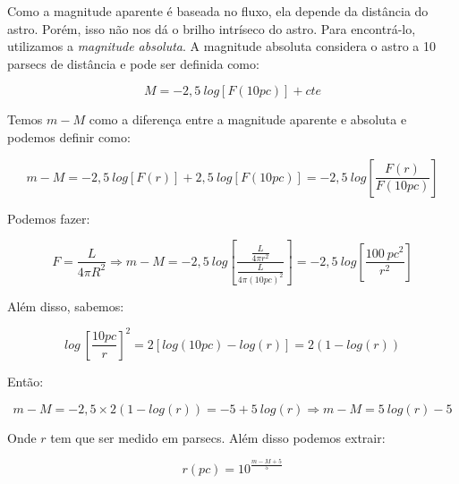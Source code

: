 Como a magnitude aparente é baseada no fluxo, ela depende da distância do astro. Porém, isso não nos dá o brilho intríseco do astro. Para encontrá-lo, utilizamos a \textit{magnitude absoluta}. A magnitude absoluta considera o astro a 10 parsecs de distância e pode ser definida como:

$$M = -2,5 \ log[F(10pc)] + cte$$

Temos $m - M$ como a diferença entre a magnitude aparente e absoluta e podemos definir como:

$$m - M = -2,5 \ log[F(r)] + 2,5 \ log[F(10pc)] = -2,5 \ log \left[ \frac{F(r)}{F(10pc)} \right]$$

Podemos fazer:

$$F = \frac{L}{4 \pi R^{2}} \Rightarrow m - M = -2,5 \ log \left[ \frac{\frac{L}{4 \pi r^{2}}}{\frac{L}{4 \pi (10pc)^{2}}}  \right] = -2,5 \ log \left[ \frac{100 \ pc^{2}}{r^{2}} \right]$$

Além disso, sabemos:

$$log \ \left[ \frac{10 pc}{r} \right]^{2} = 2 [log(10 pc) - log(r)] = 2(1 - log(r))$$

Então:

$$m - M = -2,5 \times 2(1-log(r)) = -5 + 5 \ log(r) \Rightarrow m - M = 5 \ log(r) - 5$$

Onde $r$ tem que ser medido em parsecs. Além disso podemos extrair:

$$r(pc) = 10^{\frac{m - M + 5}{5}}$$